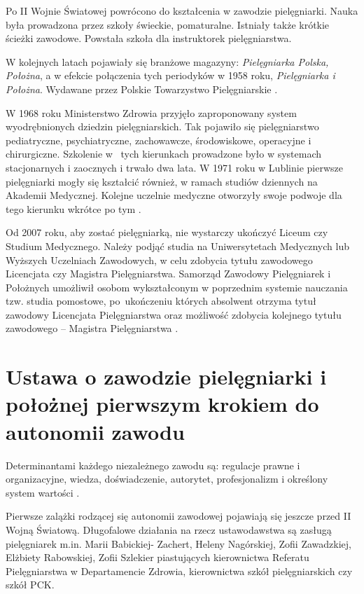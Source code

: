 \documentclass[a4paper,12pt,twoside,openright]{mwrep}
\begin{document}
Po II Wojnie Światowej powrócono do kształcenia w zawodzie pielęgniarki. Nauka była prowadzona przez szkoły świeckie, pomaturalne. Istniały także krótkie ścieżki zawodowe. Powstała szkoła dla instruktorek pielęgniarstwa.

W kolejnych latach pojawiały się branżowe magazyny: \textit{Pielęgniarka Polska, Położna}, a w efekcie połączenia tych periodyków w 1958 roku, \textit{Pielęgniarka i Położna}. Wydawane przez Polskie Towarzystwo Pielęgniarskie \cite{czas}.

W 1968 roku Ministerstwo Zdrowia przyjęło zaproponowany system wyodrębnionych dziedzin pielęgniarskich. Tak pojawiło się pielęgniarstwo pediatryczne, psychiatryczne, zachowawcze, środowiskowe, operacyjne i chirurgiczne. Szkolenie w~ tych kierunkach prowadzone było w systemach stacjonarnych i zaocznych i trwało dwa lata. W 1971 roku w Lublinie pierwsze pielęgniarki mogły się kształcić również, w ramach studiów dziennych na Akademii Medycznej. Kolejne uczelnie medyczne otworzyły swoje podwoje dla tego kierunku wkrótce po tym \cite{spec}.
 
Od 2007 roku, aby zostać pielęgniarką, nie wystarczy ukończyć Liceum czy Studium Medycznego. Należy podjąć studia na Uniwersytetach Medycznych lub Wyższych Uczelniach Zawodowych, w celu zdobycia tytułu zawodowego Licencjata czy Magistra Pielęgniarstwa. Samorząd Zawodowy Pielęgniarek i Położnych umożliwił osobom wykształconym w poprzednim systemie nauczania tzw. studia pomostowe, po~ukończeniu których absolwent otrzyma tytuł zawodowy Licencjata Pielęgniarstwa oraz możliwość zdobycia kolejnego tytułu zawodowego – Magistra Pielęgniarstwa \cite{model}.

\section{Ustawa o zawodzie pielęgniarki i położnej pierwszym krokiem do autonomii zawodu}
Determinantami każdego niezależnego zawodu  są: regulacje prawne i organizacyjne, wiedza, doświadczenie, autorytet, profesjonalizm i określony system wartości \cite{deter}.

Pierwsze zalążki rodzącej się autonomii zawodowej pojawiają się jeszcze przed II Wojną Światową. Długofalowe działania na rzecz ustawodawstwa są zasługą pielęgniarek m.in.  Marii Babickiej- Zachert, Heleny Nagórskiej, Zofii Zawadzkiej, Elżbiety Rabowskiej, Zofii Szlekier piastujących kierownictwa Referatu Pielęgniarstwa w Departamencie Zdrowia, kierownictwa szkół pielęgniarskich czy  szkół PCK.
\end{document}
